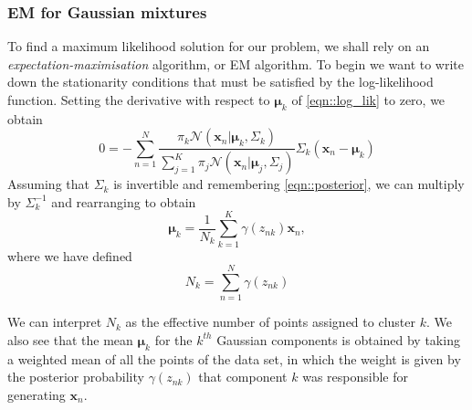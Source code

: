 \documentclass[a4paper]{article}
\begin{document}
 	\subsubsection{EM for Gaussian mixtures}
 	To find a maximum likelihood solution for our problem, we shall rely on an \textit{expectation-maximisation} algorithm, or EM algorithm.
 	To begin we want to write down the stationarity conditions that must be satisfied by the log-likelihood function.
 	Setting the derivative with respect to $\boldsymbol{\mu}_{k}$ of \eqref{eqn::log_lik} to zero, we obtain
 	\begin{equation*}
 	0 = - \sum_{n=1}^{N} \frac{\pi_{k}\mathcal{N}\left( \boldsymbol{x}_{n} | \boldsymbol{\mu}_{k}, \Sigma_{k} \right)}{\sum_{j=1}^{K} \pi_{j}\mathcal{N}\left( \boldsymbol{x}_{n} | \boldsymbol{\mu}_{j}, \Sigma_{j} \right)} \Sigma_{k} \left( \boldsymbol{x}_{n} - \boldsymbol{\mu}_{k} \right)
 	\end{equation*}
 	Assuming that $\Sigma_{k}$ is invertible and remembering \eqref{eqn::posterior}, we can multiply by $\Sigma_{k}^{-1}$ and rearranging to obtain
 	\begin{equation*}
 	\boldsymbol{\mu}_{k} = \frac{1}{N_{k}} \sum_{k=1}^{K} \gamma \left( z_{nk} \right) \boldsymbol{x}_{n},
 	\end{equation*}
 	where we have defined
 	\begin{equation*}
 	N_{k} = \sum_{n=1}^{N} \gamma \left( z_{nk} \right)
 	\end{equation*}

 	We can interpret $N_{k}$ as the effective number of points assigned to cluster $k$. We also see that the mean $\boldsymbol{\mu}_{k}$ for the $k^{th}$ Gaussian components is obtained by taking a weighted mean of all the points of the data set, in which the weight is given by the posterior probability $\gamma \left( z_{nk} \right)$ that component $k$ was responsible for generating $\boldsymbol{x}_{n}$.
\end{document}
